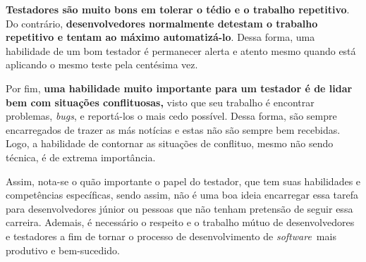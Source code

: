 \documentclass[12pt, a4paper]{article}
\newcommand{\tit}[1]{\textit{#1}}
\newcommand{\tb}[1]{\textbf{#1}}
\newcommand{\sw}{\tit{software}}
\begin{document}
    \tb{Testadores são muito bons em tolerar o tédio e o trabalho repetitivo}. Do contrário, \tb{desenvolvedores normalmente detestam o trabalho repetitivo e tentam ao máximo automatizá-lo}. Dessa forma, uma habilidade de um bom testador é permanecer alerta e atento mesmo quando está aplicando o mesmo teste pela centésima vez.
    
    Por fim, \tb{uma habilidade muito importante para um testador é de lidar bem com situações conflituosas,} visto que seu trabalho é encontrar problemas, \tit{bugs}, e reportá-los o mais cedo possível. Dessa forma, são sempre encarregados de trazer as más notícias e estas não são sempre bem recebidas. Logo, a habilidade de contornar as situações de conflituo, mesmo não sendo técnica, é de extrema importância. 
    
    Assim, nota-se o quão importante o papel do testador, que tem suas habilidades e competências específicas, sendo assim, não é uma boa ideia encarregar essa tarefa para desenvolvedores júnior ou pessoas que não tenham pretensão de seguir essa carreira. Ademais, é necessário o respeito e o trabalho mútuo de desenvolvedores e testadores a fim de tornar o processo de desenvolvimento de \sw \ mais produtivo e bem-sucedido.
    
    
    
    
    
\end{document}
